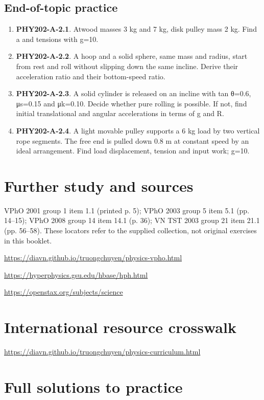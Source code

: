 \documentclass[11pt,a4paper,openany]{book}
\begin{document}
\section{End-of-topic practice}
\begin{enumerate}
\item \textbf{PHY202-A-2.1}. Atwood masses 3 kg and 7 kg, disk pulley mass 2 kg. Find a and tensions with g=10.
\item \textbf{PHY202-A-2.2}. A hoop and a solid sphere, same mass and radius, start from rest and roll without slipping down the same incline. Derive their acceleration ratio and their bottom-speed ratio.
\item \textbf{PHY202-A-2.3}. A solid cylinder is released on an incline with tan θ=0.6, μs=0.15 and μk=0.10. Decide whether pure rolling is possible. If not, find initial translational and angular accelerations in terms of g and R.
\item \textbf{PHY202-A-2.4}. A light movable pulley supports a 6 kg load by two vertical rope segments. The free end is pulled down 0.8 m at constant speed by an ideal arrangement. Find load displacement, tension and input work; g=10.
\end{enumerate}
\chapter*{Further study and sources}
VPhO 2001 group 1 item 1.1 (printed p. 5); VPhO 2003 group 5 item 5.1 (pp. 14–15); VPhO 2008 group 14 item 14.1 (p. 36); VN TST 2003 group 21 item 21.1 (pp. 56–58). These locators refer to the supplied collection, not original exercises in this booklet.

\url{https://diavn.github.io/truongchuyen/physics-vpho.html}

\url{https://hyperphysics.gsu.edu/hbase/hph.html}

\url{https://openstax.org/subjects/science}
\chapter*{International resource crosswalk}
\url{https://diavn.github.io/truongchuyen/physics-curriculum.html}
\appendix
\chapter{Full solutions to practice}
\end{document}
